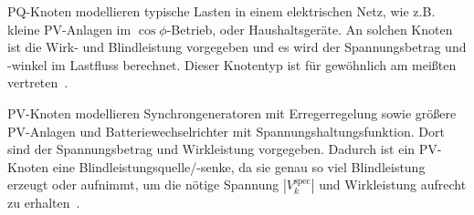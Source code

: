 PQ-Knoten modellieren typische Lasten in einem elektrischen Netz, wie z.B. kleine PV-Anlagen im $\cos\phi$-Betrieb, oder Haushaltsgeräte. An solchen Knoten ist die Wirk- und Blindleistung vorgegeben und es wird der Spannungsbetrag und -winkel im Lastfluss berechnet. Dieser Knotentyp ist für gewöhnlich am meißten vertreten~\cite{Kersting2017, Milanovic2013}.\\

PV-Knoten modellieren Synchrongeneratoren mit Erregerregelung sowie größere PV-Anlagen und Batteriewechselrichter mit Spannungshaltungsfunktion. Dort sind der Spannungsbetrag und Wirkleistung vorgegeben. Dadurch ist ein PV-Knoten eine Blindleistungsquelle/-senke, da sie genau so viel Blindleistung erzeugt oder aufnimmt, um die nötige Spannung $|V_k^{\text{spec}}|$ und Wirkleistung aufrecht zu erhalten~\cite{daCosta1999, Kundur1994, IEEE1547_2018}.\\



